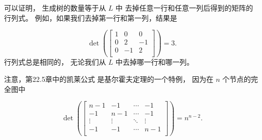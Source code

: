可以证明，
生成树的数量等于从 $L$ 中
去掉任意一行和任意一列后得到的矩阵的行列式。
例如，如果我们去掉第一行和第一列，结果是

\[ \det(
\begin{bmatrix}
  1 & 0 & 0 \\
  0 & 2 & -1 \\
  0 & -1 & 2 \\
 \end{bmatrix}
) =3.\]
行列式总是相同的，
无论我们从 $L$ 中去掉哪一行和哪一列。

注意，第22.5章中的凯莱公式
是基尔霍夫定理的一个特例，
因为在 $n$ 个节点的完全图中

\[ \det(
\begin{bmatrix}
  n-1 & -1 & \cdots & -1 \\
  -1 & n-1 & \cdots & -1 \\
  \vdots & \vdots & \ddots & \vdots \\
  -1 & -1 & \cdots & n-1 \\
 \end{bmatrix}
) =n^{n-2}.\]



